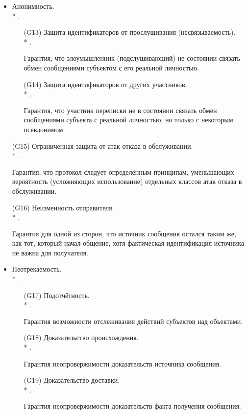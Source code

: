 \begin{itemize}
	\item Анонимность.\\*
		.
	\begin{itemize}
		\item[(G13)] Защита идентификаторов от прослушивания (несвязываемость).\\*
			.
		\item[{}] Гарантия, что злоумышленник (подслушивающий) не состоянии связать обмен сообщениями субъектом с его реальной личностью.
		\item[(G14)] Защита идентификаторов от других участников.\\*
			.
		\item[{}] Гарантия, что участник переписки не в состоянии связать обмен сообщениями субъекта с реальной личностью, но только с некоторым псевдонимом.
	\end{itemize}

	\item[(G15)] Ограниченная защита от атак отказа в обслуживании.\\*
		.
	\item[{}] Гарантия, что протокол следует определённым принципам, уменьшающих вероятность (усложняющих использование) отдельных классов атак отказа в обслуживании.

	\item[(G16)] Неизменность отправителя.\\*
		.
	\item[{}] Гарантия для одной из сторон, что источник сообщения остался таким же, как тот, который начал общение, хотя фактическая идентификация источника не важна для получателя.

	\item Неотрекаемость.\\*
		.
	\begin{itemize}
		\item[(G17)] Подотчётность.\\*
			.
		\item[{}] Гарантия возможности отслеживания действий субъектов над объектами.
		\item[(G18)] Доказательство происхождения.\\*
			.
		\item[{}] Гарантия неопровержимости доказательств источника сообщения.
		\item[(G19)] Доказательство доставки.\\*
			.
		\item[{}] Гарантия неопровержимости доказательств факта получения сообщения.
	\end{itemize}


\end{itemize}
